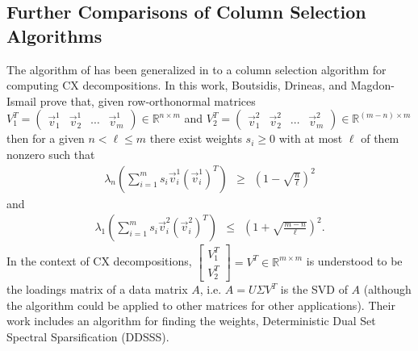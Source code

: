 \documentclass[final,leqno,onefignum,onetabnum]{siamltex1213}
\begin{document}
\subsection{Further Comparisons of Column Selection Algorithms}
The algorithm of \cite{ramanujansparse} has been generalized in \cite{nearoptcol} to a column selection algorithm for computing CX decompositions.  In this work, Boutsidis, Drineas, and Magdon-Ismail prove that, given row-orthonormal matrices $V_1^T=\begin{pmatrix}\vec{v}_1^1&\vec{v}_2^1&\cdots&\vec{v}_m^1\end{pmatrix} \in \mathbb{R}^{n \times m}$ and $V_2^T=\begin{pmatrix}\vec{v}_1^2&\vec{v}_2^2&\cdots&\vec{v}_m^2\end{pmatrix}\in \mathbb{R}^{(m-n) \times m}$ then for a given $n<\ell\le m$ there exist weights $s_i \ge 0$ with at most $\ell$ of them nonzero such that
\begin{eqnarray}
 \lambda_{n}\left(\sum_{i=1}^ms_i\vec{v}_i^1\left(\vec{v}_i^1\right)^T\right)\ \ \ge\ \ \left(1-\sqrt{\frac{n}{\ell}}\right)^2\label{weighted0}
 \end{eqnarray}
 and
 \begin{eqnarray}
 \lambda_1\left(\sum_{i=1}^ms_i\vec{v}_i^2\left(\vec{v}_i^2\right)^T\right)\ \ \le\ \ \left(1+\sqrt{\frac{m-n}{\ell}}\right)^2.\label{weighted1}
\end{eqnarray}
In the context of CX decompositions, $\left[\begin{matrix}V_1^T\\ V_2^T\end{matrix}\right]=V^T\in\mathbb{R}^{m\times m}$ is understood to be the loadings matrix of a data matrix $A$, i.e. $A=U\Sigma V^T$ is the SVD of $A$ (although the algorithm could be applied to other matrices for other applications).  Their work includes an algorithm for finding the weights, Deterministic Dual Set Spectral Sparsification (DDSSS).
\end{document}
